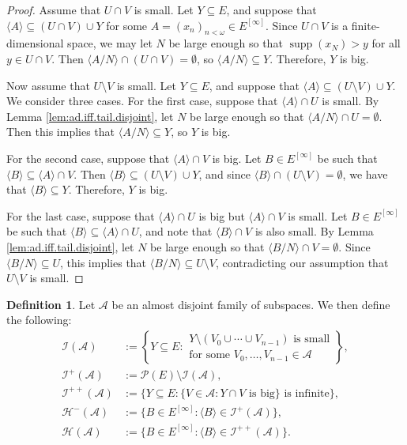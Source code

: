 \documentclass[11pt,reqno]{amsart}
\theoremstyle{plain}
\numberwithin{equation}{section}
\theoremstyle{definition}
\newtheorem{definition}[theorem]{Definition}
\newcommand{\func}{\operatorname}
\renewcommand{\c}[1]{\langle #1 \rangle}
\renewcommand{\ss}[1]{\left\{ #1 \right\}}
\newcommand{\Po}{\cal{P}}
\newcommand{\cal}{\mathcal}
\newcommand{\supp}{\func{supp}}
\newcommand{\m}[1]{\begin{matrix} #1 \end{matrix}}
\newcommand{\A}{\cal{A}}
\renewcommand{\H}{\cal{H}}
\newcommand{\I}{\cal{I}}
\begin{document}
\begin{proof}
    Assume that $U \cap V$ is small. Let $Y \subseteq E$, and suppose that $\c{A} \subseteq (U \cap V) \cup Y$ for some $A = (x_n)_{n<\omega} \in E^{[\infty]}$. Since $U \cap V$ is a finite-dimensional space, we may let $N$ be large enough so that $\supp(x_N) > y$ for all $y \in U \cap V$. Then $\c{A/N} \cap (U \cap V) = \emptyset$, so $\c{A/N} \subseteq Y$. Therefore, $Y$ is big.

    Now assume that $U \setminus V$ is small. Let $Y \subseteq E$, and suppose that $\c{A} \subseteq (U \setminus V) \cup Y$. We consider three cases. For the first case, suppose that $\c{A} \cap U$ is small. By Lemma \ref{lem:ad.iff.tail.disjoint}, let $N$ be large enough so that $\c{A/N} \cap U = \emptyset$. Then this implies that $\c{A/N} \subseteq Y$, so $Y$ is big.

    For the second case, suppose that $\c{A} \cap V$ is big. Let $B \in E^{[\infty]}$ be such that $\c{B} \subseteq \c{A} \cap V$. Then $\c{B} \subseteq (U \setminus V) \cup Y$, and since $\c{B} \cap (U \setminus V) = \emptyset$, we have that $\c{B} \subseteq Y$. Therefore, $Y$ is big.

    For the last case, suppose that $\c{A} \cap U$ is big but $\c{A} \cap V$ is small. Let $B \in E^{[\infty]}$ be such that $\c{B} \subseteq \c{A} \cap U$, and note that $\c{B} \cap V$ is also small. By Lemma \ref{lem:ad.iff.tail.disjoint}, let $N$ be large enough so that $\c{B/N} \cap V = \emptyset$. Since $\c{B/N} \subseteq U$, this implies that $\c{B/N} \subseteq U \setminus V$, contradicting our assumption that $U \setminus V$ is small.
\end{proof}

\begin{definition}
\label{def:ad.semi-ideals.and.semicoideals}
    Let $\A$ be an almost disjoint family of subspaces. We then define the following:
    \begin{align*}
        \I(\A) &:= \ss{Y \subseteq E : \m{Y \setminus (V_0 \cup \cdots \cup V_{n-1}) \text{ is small} \\ \text{for some } V_0,\dots,V_{n-1} \in \A}}, \\
        \I^+(\A) &:= \Po(E) \setminus \I(\A), \\
        \I^{++}(\A) &:= \{Y \subseteq E : \{V \in \A : Y \cap V \text{ is big}\} \text{ is infinite}\}, \\
        \H^-(\A) &:= \{B \in E^{[\infty]} : \c{B} \in \I^+(\A)\}, \\
        \H(\A) &:= \{B \in E^{[\infty]} : \c{B} \in \I^{++}(\A)\}.
    \end{align*}
\end{definition}
\end{document}
